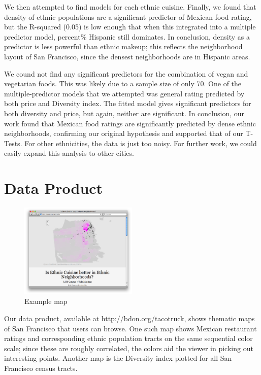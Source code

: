 \documentclass[11pt,twocolumn]{article}
\begin{document}
We then attempted to find models for each ethnic cuisine. Finally, we found that density of ethnic populations are a significant predictor of Mexican food rating, but the R-squared (0.05) is low enough that when this integrated into a multiple predictor model, percent\% Hispanic still dominates. In conclusion, density as a predictor is less powerful than ethnic makeup; this reflects the neighborhood layout of San Francisco, since the densest neighborhoods are in Hispanic areas.

We cound not find any significant predictors for the combination of vegan and vegetarian foods. This was likely due to a sample size of only 70. One of the multiple-predictor models that we attempted was general rating predicted by both price and Diversity index. The fitted model gives significant predictors for both diversity and price, but again, neither are significant. In conclusion, our work found that Mexican food ratings are significantly predicted by dense ethnic neighborhoods, confirming our original hypothesis and supported that of our T-Tests. For other ethnicities, the data is just too noisy. For further work, we could easily expand this analysis to other cities.

\section{Data Product}

\begin{figure}[h!]
  \caption{Example map}
  \centering
  \includegraphics[width=0.5\textwidth]{webapp_screen}
\end{figure}

Our data product, available at http://bdon.org/tacotruck, shows thematic maps of San Francisco that users can browse. One such map shows Mexican restaurant ratings and corresponding ethnic population tracts on the same sequential color scale; since these are roughly correlated, the colors aid the viewer in picking out interesting points. Another map is the Diversity index plotted for all San Francisco census tracts.
\end{document}
